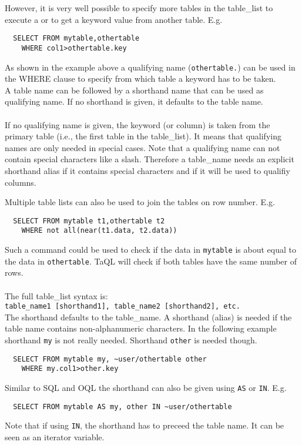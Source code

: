 However, it is very well possible to specify more tables in the
table\_list to execute a  or to get a keyword
value from another table.
E.g.
\begin{verbatim}
  SELECT FROM mytable,othertable
    WHERE col1>othertable.key
\end{verbatim}
As shown in the example above a qualifying name (\verb+othertable.+)
can be used in the WHERE
clause to specify from which table a keyword has to be taken.
\\A table name can be followed by a shorthand name that can be used as
qualifying name. If no shorthand is given, it defaults to the table
name.

\paragraph*{}
If no qualifying name is given, the keyword (or column) is taken
from the primary table (i.e., the first table in the table\_list).
It means that qualifying names are only needed in special cases.
Note that a qualifying name can not contain special characters like a slash.
Therefore a table\_name needs an explicit shorthand alias
if it contains special characters and if it will be used to qualifiy columns.

Multiple table lists can also be used to join the tables on row
number. E.g.
\begin{verbatim}
  SELECT FROM mytable t1,othertable t2
    WHERE not all(near(t1.data, t2.data))
\end{verbatim}
Such a command could be used to check if the data in \texttt{mytable} is about
equal to the data in \texttt{othertable}. TaQL will check if both tables have the
same number of rows.

\paragraph*{}
The full table\_list syntax is:
\\
\texttt{table\_name1 [shorthand1], table\_name2 [shorthand2], etc.}
\\The shorthand defaults to the table\_name. A shorthand (alias) is needed if
the table name contains non-alphanumeric characters.
In the following example shorthand \texttt{my} is not really needed.
Shorthand \texttt{other} is needed though.
\begin{verbatim}
  SELECT FROM mytable my, ~user/othertable other
    WHERE my.col1>other.key
\end{verbatim}
Similar to SQL and OQL the shorthand can also be given using
\texttt{AS} or \texttt{IN}. E.g.
\begin{verbatim}
  SELECT FROM mytable AS my, other IN ~user/othertable
\end{verbatim}
Note that if using \texttt{IN}, the shorthand has to preceed
the table name. It can be seen as an iterator variable.

